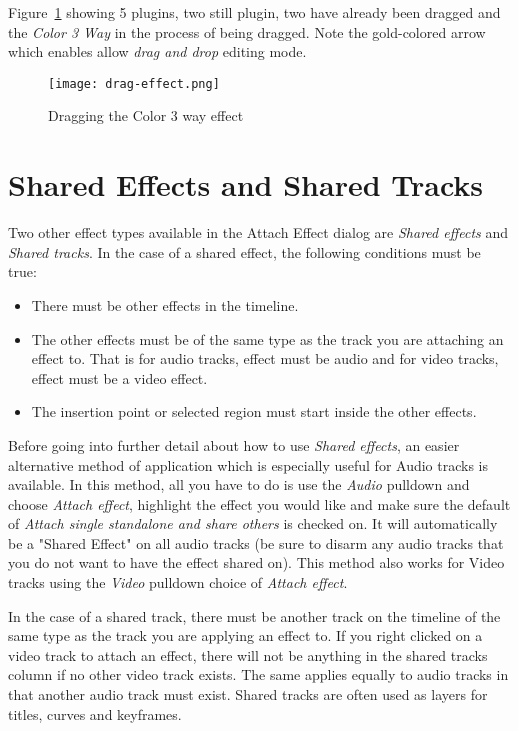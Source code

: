 Figure~\ref{fig:drag-effect} showing 5 plugins, two still plugin, two have already been dragged and the \textit{Color 3 Way} in the process of being dragged. Note the gold-colored arrow which enables allow \textit{drag and drop} editing mode.

\begin{figure}[htpb]
    \centering
    \texttt{[image: drag-effect.png]}
    \caption{Dragging the Color 3 way effect}
    \label{fig:drag-effect}
\end{figure}

\section{Shared Effects and Shared Tracks}%
\label{sec:shared_effect_tracks}

Two other effect types available in the Attach Effect dialog are \textit{Shared effects} and \textit{Shared tracks}. In the case of a shared effect, the following conditions must be true:

\begin{itemize}[noitemsep]
    \item There must be other effects in the timeline.
    \item The other effects must be of the same type as the track you are attaching an effect to. That is for audio tracks, effect must be audio and for video tracks, effect must be a video effect.
    \item The insertion point or selected region must start inside the other effects.
\end{itemize}

Before going into further detail about how to use \textit{Shared effects}, an easier
alternative method of application which is especially useful for Audio tracks is
available.  In this method, all you have to do is use the \textit{Audio} pulldown and
choose \textit{Attach effect}, highlight the effect you would like and make sure the
default of \textit{Attach single standalone and share others} is checked on.  It will
automatically be a "Shared Effect" on all audio tracks (be sure to disarm any audio
tracks that you do not want to have the effect shared on).  This method also works for
Video tracks using the \textit{Video} pulldown choice of \textit{Attach effect}.

In the case of a shared track, there must be another track on the timeline of the same type as the track you are applying an effect to. If you right clicked on a video track to attach an effect, there will not be anything in the shared tracks column if no other video track exists. The same applies equally to audio tracks in that another audio track must exist. Shared tracks are often used as layers for titles, curves and keyframes.

